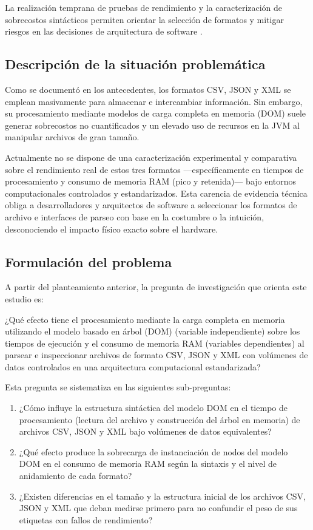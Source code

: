 La realización temprana de pruebas de rendimiento y la caracterización de sobrecostos sintácticos permiten orientar la selección de formatos y mitigar riesgos en las decisiones de arquitectura de software \cite{smith2002performance}.


\subsection{Descripción de la situación problemática}

Como se documentó en los antecedentes, los formatos CSV, JSON y XML se emplean masivamente para almacenar e intercambiar información. Sin embargo, su procesamiento mediante modelos de carga completa en memoria (DOM) suele generar sobrecostos no cuantificados y un elevado uso de recursos en la JVM al manipular archivos de gran tamaño.

Actualmente no se dispone de una caracterización experimental y comparativa sobre el rendimiento real de estos tres formatos —específicamente en tiempos de procesamiento y consumo de memoria RAM (pico y retenida)— bajo entornos computacionales controlados y estandarizados. Esta carencia de evidencia técnica obliga a desarrolladores y arquitectos de software a seleccionar los formatos de archivo e interfaces de parseo con base en la costumbre o la intuición, desconociendo el impacto físico exacto sobre el hardware.


\subsection{Formulación del problema}

A partir del planteamiento anterior, la pregunta de investigación que orienta este estudio es:

¿Qué efecto tiene el procesamiento mediante la carga completa en memoria utilizando el modelo basado en árbol (DOM) (variable independiente) sobre los tiempos de ejecución y el consumo de memoria RAM (variables dependientes) al parsear e inspeccionar archivos de formato CSV, JSON y XML con volúmenes de datos controlados en una arquitectura computacional estandarizada?

Esta pregunta se sistematiza en las siguientes sub-preguntas:
\begin{enumerate}
    \item[a)] ¿Cómo influye la estructura sintáctica del modelo DOM en el tiempo de procesamiento (lectura del archivo y construcción del árbol en memoria) de archivos CSV, JSON y XML bajo volúmenes de datos equivalentes?
    \item[b)] ¿Qué efecto produce la sobrecarga de instanciación de nodos del modelo DOM en el consumo de memoria RAM según la sintaxis y el nivel de anidamiento de cada formato?
    \item[c)] ¿Existen diferencias en el tamaño y la estructura inicial de los archivos CSV, JSON y XML que deban medirse primero para no confundir el peso de sus etiquetas con fallos de rendimiento?
\end{enumerate}

